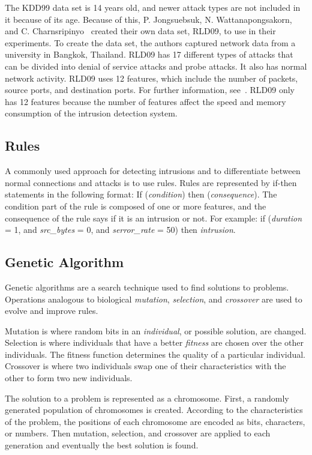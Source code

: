 \documentclass{sig-alternate}
\begin{document}
The KDD99 data set is 14 years old, and newer attack types are not included in it because of its age. Because of this, P. Jongsuebsuk, N. Wattanapongsakorn, and
C. Charnsripinyo~\cite{6496342, 6559603} created their own data set, RLD09, to use in their experiments. To create the data set, the authors captured network data from a university in Bangkok, Thailand. RLD09 has 17 different types of attacks that can be divided into denial of service attacks and probe attacks. It also has normal network activity. RLD09 uses 12 features, which include the number of packets, source ports, and destination ports. For further information, see~\cite{6496342, 6559603}. RLD09 only has 12 features because the number of features affect the speed and memory consumption of the intrusion detection system.




\subsection{Rules}
\label{sec:rules}
A commonly used approach for detecting intrusions and to differentiate between normal connections and attacks is to use rules. Rules are represented by if-then statements in the following format: If (\emph{condition}) then (\emph{consequence}). The condition part of the rule is composed of one or more features, and the consequence of the rule says if it is an intrusion or not. For example: if (\emph{duration} = 1, and \emph{src\_bytes} = 0, and \emph{serror\_rate} = 50) then \emph{intrusion}.~\cite{Fries:2008:FAN:1388969.1389037}




\subsection{Genetic Algorithm}
\label{sec:GA}
Genetic algorithms are a search technique used to find solutions to problems. Operations analogous to biological \emph{mutation}, \emph{selection}, and \emph{crossover} are used to evolve and improve rules.

Mutation is where random bits in an \emph{individual}, or possible solution, are changed. Selection is where individuals that have a better \emph{fitness} are chosen over the other individuals. The fitness function determines the quality of a particular individual. Crossover is where two individuals swap one of their characteristics with the other to form two new individuals.

The solution to a problem is represented as a chromosome. First, a randomly generated population of chromosomes is created. According to the characteristics of the problem, the positions of each chromosome are encoded as bits, characters, or numbers. Then mutation, selection, and crossover are applied to each generation and eventually the best solution is found.~\cite{DBLP:journals/corr/abs-1204-6416}
\end{document}
